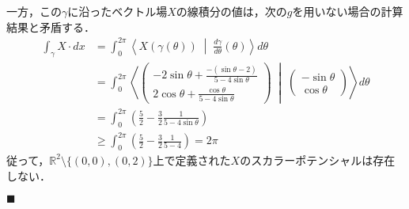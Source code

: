 \documentclass[dvipdfmx,a4paper,uplatex]{jsarticle}
\begin{document}
一方，この$\gamma$に沿ったベクトル場$X$の線積分の値は，次の$g$を用いない場合の計算結果と矛盾する．
\begin{align*}
    \int_\gamma X\cdot dx &= \int^{2\pi}_0\left\langle X(\gamma(\theta))\;\middle|\;\frac{d\gamma}{d\theta}(\theta)\right\rangle d\theta \\
    &= \int^{2\pi}_0\left\langle\begin{pmatrix}-2\sin\theta+\frac{-(\sin\theta-2)}{5-4\sin\theta}\\2\cos\theta+\frac{\cos\theta}{5-4\sin\theta}\end{pmatrix}\;\middle|\;\begin{pmatrix}-\sin\theta\\\cos\theta\end{pmatrix}\right\rangle d\theta \\
    &= \int^{2\pi}_0 \left(\frac{5}{2}-\frac{3}{2}\frac{1}{5-4\sin\theta}\right) \\
    &\ge\int^{2\pi}_0\left(\frac{5}{2}-\frac{3}{2}\frac{1}{5-4}\right) = 2\pi
\end{align*}
従って，$\mathbb{R}^2\setminus\{(0,0),(0,2)\}$上で定義された$X$のスカラーポテンシャルは存在しない．
\begin{flushright}
    $\blacksquare$
\end{flushright}
\clearpage
\end{document}
